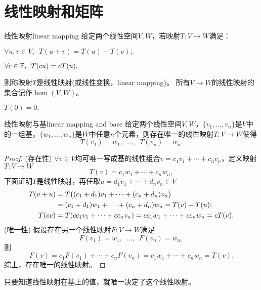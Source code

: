 \section{线性映射和矩阵}
\begin{definition}{线性映射}{linear mapping}
	给定两个线性空间$V,W$，若映射$T:V\to W$满足：
	\begin{compactenum}
		\item $\forall u,v\in V,\enspace T(u+v)=T(u)+T(v);$
		\item $\forall c\in\mathbb F,\enspace T(cu)=cT(u).$
	\end{compactenum}
	则称映射$T$是线性映射(或线性变换，linear mapping)。
	所有$V\to W$的线性映射的集合记作$\hom(V,W)$。
\end{definition}
\begin{corollary}
	$T(0)=0.$
\end{corollary}
\begin{theorem}{线性映射与基}{linear mapping and base}
	给定两个线性空间$V,W$，$\{v_1,\ldots,v_n\}$是$V$中的一组基，$\{w_1,\ldots,w_n\}$是$W$中任意$n$个元素，则存在唯一的线性映射$T:V\to W$使得
	\[
		T(v_1)=w_1,\enspace\ldots,\enspace T(v_n)=w_n.
	\]
\end{theorem}
\begin{proof}
	(存在性) $\forall v\in V$均可唯一写成基的线性组合$v=c_1v_1+\cdots+c_nv_n$，定义映射$T:V\to W$
	\[
		T(v)=c_1w_1+\cdots+c_nw_n,
	\]
	下面证明$T$是线性映射，再任取$u=d_1v_1+\cdots+d_nv_n\in V$
	\begin{align*}
		T(v+u)&=T\bigl((c_1+d_1)v_1+\cdots+(c_n+d_n)v_n\bigr)\\
		&=(c_1+d_1)w_1+\cdots+(c_n+d_n)w_n=T(v)+T(u);\\
		T(cv)&=T(cc_1v_1+\cdots+cc_nv_n)=cc_1w_1+\cdots+cc_nw_n=cT(v).
	\end{align*}
	(唯一性) 假设存在另一个线性映射$F:V\to W$满足
	\[
		F(v_1)=w_1,\enspace\ldots,\enspace F(v_n)=w_n,
	\]
	则 
	\[
		F(v)=c_1F(v_1)+\cdots+c_nF(v_n)=c_1w_1+\cdots+c_nw_n=T(v).
	\]
	综上，存在唯一的线性映射。
\end{proof}

\begin{remark}
	只要知道线性映射在基上的值，就唯一决定了这个线性映射。
\end{remark}

